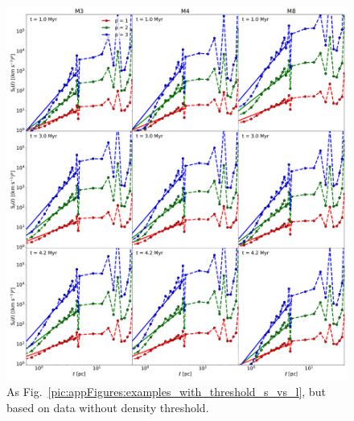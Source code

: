  	
\begin{figure}
    \centering
    \includegraphics[width=\textwidth]{app_examples_woutthres_s_l.pdf}
    \caption{
        As Fig.~\ref{pic:appFigures:examples_with_threshold_s_vs_l}, but based on data without density threshold.
    }
    \label{pic:appFigures:examples_without_threshold_s_vs_l}
\end{figure}
 	
